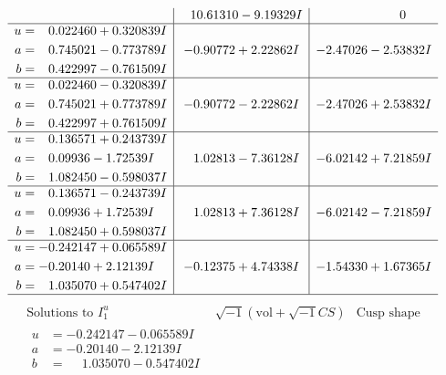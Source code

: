 \documentclass[1p]{elsarticle_modified}
\theoremstyle{definition}
\newcommand{\I}{\sqrt{-1}}
\begin{document}
$$\begin{array}{c|c|c}
 & \phantom{-}10.61310 - 9.19329 I & \phantom{-0.000000 } 0 \\ \hline\begin{aligned}
u &= \phantom{-}0.022460 + 0.320839 I \\
a &= \phantom{-}0.745021 - 0.773789 I \\
b &= \phantom{-}0.422997 - 0.761509 I\end{aligned}
 & -0.90772 + 2.22862 I & -2.47026 - 2.53832 I \\ \hline\begin{aligned}
u &= \phantom{-}0.022460 - 0.320839 I \\
a &= \phantom{-}0.745021 + 0.773789 I \\
b &= \phantom{-}0.422997 + 0.761509 I\end{aligned}
 & -0.90772 - 2.22862 I & -2.47026 + 2.53832 I \\ \hline\begin{aligned}
u &= \phantom{-}0.136571 + 0.243739 I \\
a &= \phantom{-}0.09936 - 1.72539 I \\
b &= \phantom{-}1.082450 - 0.598037 I\end{aligned}
 & \phantom{-}1.02813 - 7.36128 I & -6.02142 + 7.21859 I \\ \hline\begin{aligned}
u &= \phantom{-}0.136571 - 0.243739 I \\
a &= \phantom{-}0.09936 + 1.72539 I \\
b &= \phantom{-}1.082450 + 0.598037 I\end{aligned}
 & \phantom{-}1.02813 + 7.36128 I & -6.02142 - 7.21859 I \\ \hline\begin{aligned}
u &= -0.242147 + 0.065589 I \\
a &= -0.20140 + 2.12139 I \\
b &= \phantom{-}1.035070 + 0.547402 I\end{aligned}
 & -0.12375 + 4.74338 I & -1.54330 + 1.67365 I\\
 \hline 
 \end{array}$$\newpage$$\begin{array}{c|c|c}  
\text{Solutions to }I^u_{1}& \I (\text{vol} + \sqrt{-1}CS) & \text{Cusp shape}\\
 \hline 
\begin{aligned}
u &= -0.242147 - 0.065589 I \\
a &= -0.20140 - 2.12139 I \\
b &= \phantom{-}1.035070 - 0.547402 I\end{aligned}

\end{array}$$
\end{document}
